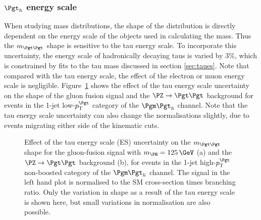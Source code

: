 \subsubsection{$\Pgth$ energy scale} 
When studying mass distributions, the shape of the distribution is directly
dependent on the energy scale of the objects used in calculating the mass. Thus the
$m_{\Pgt\Pgt}$ shape is sensitive to the tau energy scale.
To incorporate this uncertainty, the energy scale of hadronically decaying taus is varied by $3\%$,
which is constrained by fits to the tau mass discussed in section
\ref{sec:taues}. Note that compared with the tau energy scale, the effect of the
electron or muon energy scale is negligible. Figure~\ref{fig:tauessvfit} shows the
effect of the tau energy scale uncertainty on the shape of the gluon fusion signal and the
$\PZ\to\Pgt\Pgt$ background for events in the 1-jet low-$\pt^{\Pgt}$ category of
the $\mutau$ channel. Note that the tau energy scale uncertainty can also change
the normalisations slightly, due to events migrating either side of the
kinematic cuts.

\begin{figure}
\begin{center}

\end{center}
\caption[Effect of the tau energy scale uncertainty on the $m_{\Pgt\Pgt}$ shape for
the gluon-fusion signal with $m_{\PH}=125\,\GeV$ (a) and the $\ZToTauTau$ background (b).]{
Effect of the tau energy scale (ES) uncertainty on the $m_{\Pgt\Pgt}$ shape for
the gluon-fusion signal with $m_{\PH}=125\,\GeV$ (a) and the $\ZToTauTau$
background (b), for events in the 1-jet high-$\pt^{\Pgt}$ non-boosted category of
the $\mutau$ channel. The signal in the left hand plot is normalised to the
\ac{SM} cross-section times branching ratio. Only the variation in shape as a
result of the tau energy scale is shown here, but small variations in
normalisation are also possible.}
\label{fig:tauessvfit}
\end{figure} 

